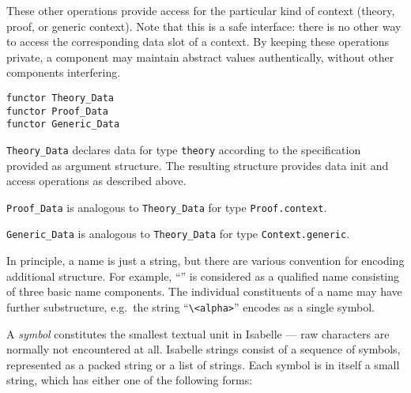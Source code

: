 \begin{isabellebody}
\begin{isamarkuptext}
  \noindent These other operations provide access for the particular
  kind of context (theory, proof, or generic context).  Note that this
  is a safe interface: there is no other way to access the
  corresponding data slot of a context.  By keeping these operations
  private, a component may maintain abstract values authentically,
  without other components interfering.%
\end{isamarkuptext}%
\isamarkuptrue%
%
\isadelimmlref
%
\endisadelimmlref
%
\isatagmlref
%
\begin{isamarkuptext}%
\begin{mldecls}
  \verb|functor Theory_Data| \\
  \verb|functor Proof_Data| \\
  \verb|functor Generic_Data| \\
  \end{mldecls}

  \begin{description}

  \item \verb|Theory_Data| declares data for
  type \verb|theory| according to the specification provided as
  argument structure.  The resulting structure provides data init and
  access operations as described above.

  \item \verb|Proof_Data| is analogous to
  \verb|Theory_Data| for type \verb|Proof.context|.

  \item \verb|Generic_Data| is analogous to
  \verb|Theory_Data| for type \verb|Context.generic|.

  \end{description}%
\end{isamarkuptext}%
\isamarkuptrue%
%
\endisatagmlref
{\isafoldmlref}%
%
\isadelimmlref
%
\endisadelimmlref
%
\isamarkuptrue%
%
\begin{isamarkuptext}%
In principle, a name is just a string, but there are various
  convention for encoding additional structure.  For example, ``'' is considered as a qualified name consisting of
  three basic name components.  The individual constituents of a name
  may have further substructure, e.g.\ the string
  ``\verb,\,\verb,<alpha>,'' encodes as a single symbol.%
\end{isamarkuptext}%
\isamarkuptrue%
%
\isamarkuptrue%
%
\begin{isamarkuptext}%
A \emph{symbol} constitutes the smallest textual unit in Isabelle
  --- raw characters are normally not encountered at all.  Isabelle
  strings consist of a sequence of symbols, represented as a packed
  string or a list of strings.  Each symbol is in itself a small
  string, which has either one of the following forms:


\end{isamarkuptext}
\end{isabellebody}

